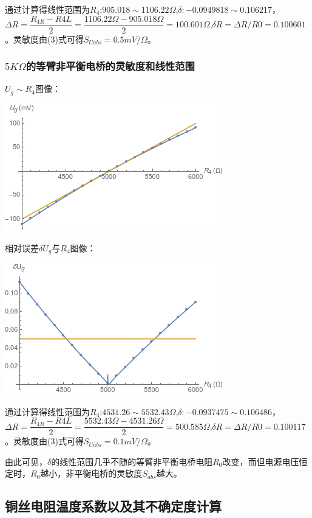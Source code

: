 \documentclass[UEF8]{ctexart}
\begin{document}
\begin{multicols}{2}
通过计算得线性范围为$R_{4}$:$905.018\sim1106.22\Omega$,$\delta:-0.0949818\sim0.106217$，$\Delta{R}=\dfrac{R_{4R}-R{4L}}{2}=\dfrac{1106.22\Omega-905.018\Omega}{2}=100.601\Omega$,$\delta{R}=\Delta{R}/R0=0.100601$。灵敏度由(3)式可得$S_{Uabs}=0.5mV/\Omega$。

\subsubsection{$5K\Omega$的等臂非平衡电桥的灵敏度和线性范围}
$U_{g}\sim{R_{4}}$图像：

\includegraphics[scale=0.6]{graphs/data5K.png}

相对误差$\delta{U_{g}}$与$R_{4}$图像：

\includegraphics[scale=0.6]{graphs/data5Kerror.png}

通过计算得线性范围为$R_{4}$:$4531.26\sim5532.43\Omega$,$\delta:-0.0937475\sim0.106486$，$\Delta{R}=\dfrac{R_{4R}-R{4L}}{2}=\dfrac{5532.43\Omega-4531.26\Omega}{2}=500.585\Omega$,$\delta{R}=\Delta{R}/R0=0.100117$。灵敏度由(3)式可得$S_{Uabs}=0.1mV/\Omega$。



由此可见，$\delta$的线性范围几乎不随的等臂非平衡电桥电阻$R_{0}$改变，而但电源电压恒定时，$R_{0}$越小，非平衡电桥的灵敏度$S_{abs}$越大。
\subsection{铜丝电阻温度系数以及其不确定度计算}

\end{multicols}
\end{document}
